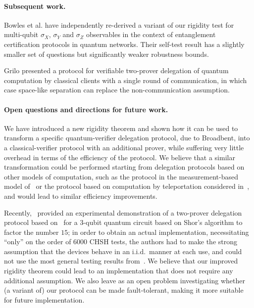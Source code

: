 \documentclass[11pt]{article}
\begin{document}
\paragraph{Subsequent work.}
Bowles et al. \cite{BowlesSCA18}  have independently re-derived a
variant of our rigidity test for multi-qubit $\sigma_X$, $\sigma_Y$ and $\sigma_Z$ observables
in the context of entanglement certification protocols in
quantum networks.
Their self-test result has a slightly smaller set of questions but  significantly weaker robustness
bounds.

Grilo \cite{Grilo17} presented a protocol  for verifiable
two-prover delegation of quantum computation by classical clients with a single round of communication, in which case space-like
separation can replace the non-communication assumption.

\paragraph{Open questions and directions for future work.}
We have introduced a new rigidity theorem and shown how it can be used to transform a specific quantum-verifier delegation protocol, due to Broadbent, into a classical-verifier protocol with an additional prover, while suffering very little overhead in terms of the efficiency of the protocol. We believe that a similar transformation could be performed starting from delegation protocols based on other models of computation, such as the protocol in the measurement-based model of~\cite{fitzsimons12vubqc} or the protocol based on computation by teleportation considered in~\cite{reichardt2012classical}, and would lead to similar efficiency improvements. 

Recently,~\cite{experiment_ruv} provided an experimental demonstration of a
two-prover delegation protocol based on~\cite{reichardt2012classical} for a
$3$-qubit quantum circuit based on Shor's algorithm to factor the number $15$;
in order to obtain an actual implementation, necessitating ``only'' on the order
of $6000$ CHSH tests, the authors had to make the strong assumption that the
devices behave in an i.i.d.\ manner at each use, and could not use the most
general testing results from~\cite{reichardt2012classical}. We believe that our
improved rigidity theorem could lead to an implementation that does not require
any additional assumption. We also leave as an open problem investigating whether (a
variant of) our protocol can be made fault-tolerant, making it more suitable for
future implementation.
\end{document}
